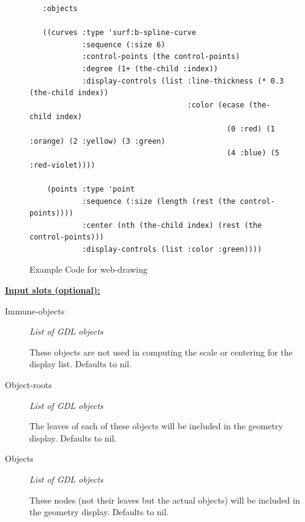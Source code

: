 \documentclass [11pt]{book}
\begin{document}
\begin{itemize}
\begin{figure}
\begin{lrbox}{\boxedverb}
\begin{minipage}{\linewidth}
{\begin{verbatim}
   :objects

   ((curves :type 'surf:b-spline-curve
            :sequence (:size 6)
            :control-points (the control-points)
            :degree (1+ (the-child :index))
            :display-controls (list :line-thickness (* 0.3 (the-child index))
                                    :color (ecase (the-child index)
                                             (0 :red) (1 :orange) (2 :yellow) (3 :green)
                                             (4 :blue) (5 :red-violet))))

    (points :type 'point 
            :sequence (:size (length (rest (the control-points))))
            :center (nth (the-child index) (rest (the control-points)))
            :display-controls (list :color :green))))

\end{verbatim}}
\end{minipage}
\end{lrbox}
\fbox{\usebox{\boxedverb}}

\caption{Example Code for web-drawing}

\label{fig:example-code-web-drawing}

\end{figure}





\textbf{
\underline{Input slots (optional):}}

\begin{description}

\item [Immune-objects]
\emph{List of GDL objects}

 These objects are not used in computing the scale or centering for the display list. Defaults to nil.




\item [Object-roots]
\emph{List of GDL objects}

 The leaves of each of these objects will be included in the geometry display. Defaults to nil.




\item [Objects]
\emph{List of GDL objects}

 These nodes (not their leaves but the actual objects) will be included in the geometry display. Defaults to nil.





\end{description}
\end{itemize}
\end{document}
